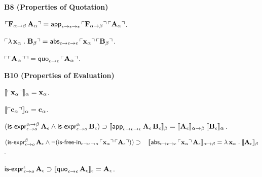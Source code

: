 \documentclass[fleqn]{llncs}
\begin{document}
\noindent
\begin{minipage}{\textwidth}
  \noindent\textbf{B8 (Properties of Quotation)}
  \be

    \item $\ulcorner\textbf{F}_{\alpha \rightarrow \beta} \,
      \textbf{A}_\alpha\urcorner = \mbox{\sf app}_{\epsilon \rightarrow \epsilon
      \rightarrow \epsilon} \, \ulcorner\textbf{F}_{\alpha \rightarrow
        \beta}\urcorner \, \ulcorner\textbf{A}_\alpha\urcorner$.

    \item $\ulcorner\lambda\, \textbf{x}_\alpha \mathrel.
      \textbf{B}_\beta\urcorner = \mbox{\sf abs}_{\epsilon \rightarrow \epsilon
      \rightarrow \epsilon} \, \ulcorner\textbf{x}_\alpha\urcorner \,
      \ulcorner\textbf{B}_\beta\urcorner$.

    \item $\ulcorner\ulcorner\textbf{A}_\alpha\urcorner\urcorner =
      \mbox{\sf quo}_{\epsilon \rightarrow \epsilon} \,
      \ulcorner\textbf{A}_\alpha\urcorner$.

  \ee

  \noindent\textbf{B10 (Properties of Evaluation)}

  \be

    \item $\llbracket\ulcorner\textbf{x}_\alpha\urcorner\rrbracket_\alpha = \textbf{x}_\alpha$.

    \item $\llbracket\ulcorner\textbf{c}_\alpha\urcorner\rrbracket_\alpha = \textbf{c}_\alpha$.

    \item $(\mbox{\sf is-expr}_{\epsilon \rightarrow o}^{\alpha \rightarrow \beta}
      \, \textbf{A}_\epsilon \wedge \mbox{\sf is-expr}_{\epsilon \rightarrow o}^{\alpha}
      \, \textbf{B}_\epsilon) \supset
          \llbracket\mbox{\sf app}_{\epsilon \rightarrow \epsilon
          \rightarrow \epsilon} \, \textbf{A}_\epsilon \,
        \textbf{B}_\epsilon\rrbracket_{\beta} =
      \llbracket\textbf{A}_\epsilon\rrbracket_{\alpha \rightarrow \beta} \,
      \llbracket\textbf{B}_\epsilon\rrbracket_{\alpha}$.

    \item $(\mbox{\sf is-expr}_{\epsilon \rightarrow o}^{\beta} \,
      \textbf{A}_\epsilon \wedge \neg(\mbox{\sf is-free-in}_{\epsilon \rightarrow
        \epsilon \rightarrow o} \, \ulcorner\textbf{x}_\alpha\urcorner \,
      \ulcorner\textbf{A}_\epsilon\urcorner)) \supset\\[.5ex]
      \hspace*{2ex} \llbracket\mbox{\sf abs}_{\epsilon \rightarrow \epsilon
          \rightarrow \epsilon} \, \ulcorner\textbf{x}_\alpha\urcorner \,
        \textbf{A}_\epsilon\rrbracket_{\alpha \rightarrow \beta} = \lambda\,
      \textbf{x}_\alpha \mathrel. \llbracket\textbf{A}_\epsilon\rrbracket_\beta$.

    \item $\mbox{\sf is-expr}_{\epsilon \rightarrow o}^\epsilon \,
      \textbf{A}_\epsilon \supset \llbracket\mbox{\sf quo}_{\epsilon
          \rightarrow \epsilon} \, \textbf{A}_\epsilon\rrbracket_\epsilon =
      \textbf{A}_\epsilon$.

  \ee

\end{minipage}
\end{document}
